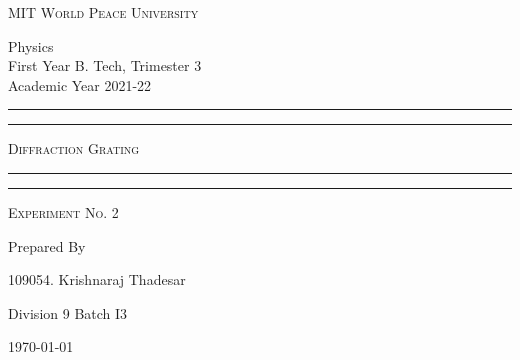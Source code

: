 \documentclass[11pt]{article}
\begin{document}
	
	\begin{titlepage} 
		\centering 
		
		
		\huge\textsc{
			MIT World Peace University
		}\\
	
		\vspace{0.75\baselineskip} %
		
		\LARGE{
			Physics\\
			First Year B. Tech, Trimester 3\\
			Academic Year 2021-22
		}
		
		\vfill %
		
		
		\rule{\textwidth}{1.6pt}\vspace*{-\baselineskip}\vspace*{2pt}
		\rule{\textwidth}{0.6pt}
		\vspace{0.75\baselineskip} %
		
		
		
		\huge{\textsc{
				Diffraction Grating
			}} \\
		
		
		
		\vspace{0.5\baselineskip} %
		\rule{\textwidth}{0.6pt}\vspace*{-\baselineskip}\vspace*{2.8pt}
		\rule{\textwidth}{1.6pt}
		
		\vspace{1\baselineskip} %

			
		\LARGE\textsc{
			Experiment No. 2
		} %
		\vfill
		
		
		Prepared By
		\vspace{0.5\baselineskip} %
		
		\Large{
			109054. Krishnaraj Thadesar
			
			Division 9 Batch I3
		}
		
		
		\vspace{0.5\baselineskip} %
		\today

	\end{titlepage}
\end{document}
